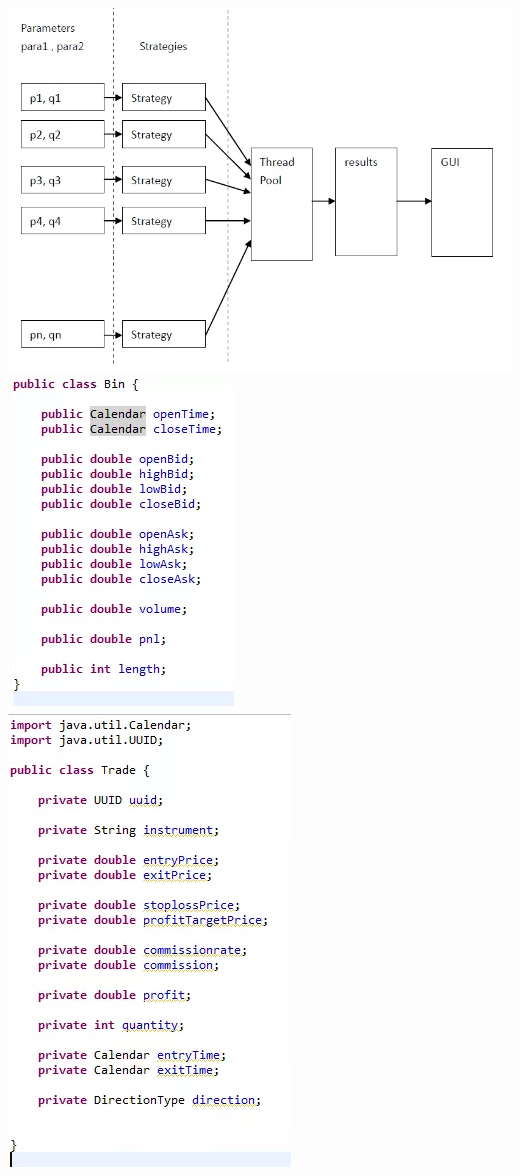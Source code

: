 \documentclass[11pt, openany]{book}              %
\begin{document}
\includegraphics[scale=0.5]{3.JPG}
\includegraphics[scale=0.5]{4.JPG}
\includegraphics[scale=0.5]{5.JPG}
\end{document}
